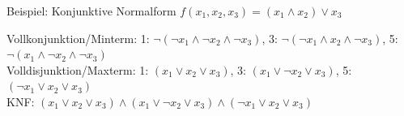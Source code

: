\documentclass[12pt%
,xcolor=table
,aspectratio=169%
]{beamer}
\begin{document}
\begin{frame}{Beispiel: Konjunktive Normalform}
\vspace*{-0.325cm}
$f(x_1, x_2, x_3) = (x_1 \land x_2) \lor x_3$
\begin{table}[]
\end{table}
Vollkonjunktion/Minterm: 1: $\neg(\neg x_1 \land \neg x_2 \land \neg x_3)$, 3: $\neg(\neg x_1 \land x_2 \land \neg x_3)$, 5: $\neg(x_1 \land \neg x_2 \land \neg x_3)$\\
Volldisjunktion/Maxterm: 1: $(x_1 \lor x_2 \lor x_3)$, 3: $(x_1 \lor \neg x_2 \lor x_3)$, 5: $(\neg x_1 \lor x_2 \lor x_3)$\\
KNF: $(x_1 \lor x_2 \lor x_3) \land (x_1 \lor \neg x_2 \lor x_3) \land (\neg x_1 \lor x_2 \lor x_3)$
\end{frame}
\end{document}
